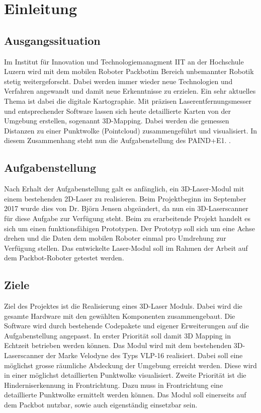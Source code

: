 
\chapter{Einleitung}

\section {Ausgangssituation}
\label{sec:Ausgangssituation}
Im Institut für Innovation und Technologiemanagment IIT an der Hochschule Luzern wird mit dem mobilen Roboter \grqq Packbot\grqq  im Bereich unbemannter Robotik stetig weitergeforscht. Dabei werden immer wieder neue Technologien und Verfahren angewandt und damit neue Erkenntnisse zu erzielen. Ein sehr aktuelles Thema ist dabei die digitale Kartographie. Mit präzisen Laserentfernungsmesser und entsprechender Software lassen sich heute detaillierte Karten von der Umgebung erstellen, sogenannt 3D-Mapping. Dabei werden die gemessen Distanzen zu einer Punktwolke (Pointcloud) zusammengeführt und visualisiert.
In diesem Zusammenhang steht nun die Aufgabenstellung des PAIND+E1.
.
\section{Aufgabenstellung}
\label{sec:Aufgabenstellung}
Nach Erhalt der Aufgabenstellung galt es anfänglich, ein 3D-Laser-Modul mit einem bestehenden 2D-Laser zu realisieren. Beim Projektbeginn im September 2017 wurde dies von Dr. Björn Jensen abgeändert, da nun ein 3D-Laserscanner für diese Aufgabe zur Verfügung steht. Beim zu erarbeitende Projekt handelt es sich um einen funktionsfähigen Prototypen. Der Prototyp soll sich um eine Achse drehen und die Daten dem mobilen Roboter einmal pro Umdrehung zur Verfügung stellen. Das entwickelte Laser-Modul soll im Rahmen der Arbeit auf dem Packbot-Roboter getestet werden.

\section{Ziele}
\label{sec:Ziele}
Ziel des Projektes ist die Realisierung eines 3D-Laser Moduls. Dabei wird die gesamte Hardware mit den gewählten Komponenten zusammengebaut. Die Software wird durch bestehende Codepakete und eigener Erweiterungen auf die Aufgabenstellung angepasst. In erster Priorität soll damit 3D Mapping in Echtzeit betrieben werden können. Das Modul wird mit dem bestehenden 3D-Laserscanner der Marke Velodyne des Typs VLP-16 realisiert. Dabei soll eine möglichst grosse räumliche Abdeckung der Umgebung erreicht werden. Diese wird in einer möglichst detaillierten Punktwolke visualisiert. Zweite Priorität ist die Hinderniserkennung in Frontrichtung. Dazu muss in Frontrichtung eine detaillierte Punktwolke ermittelt werden können. Das Modul soll einerseits auf dem Packbot nutzbar, sowie auch eigenständig einsetzbar sein.



